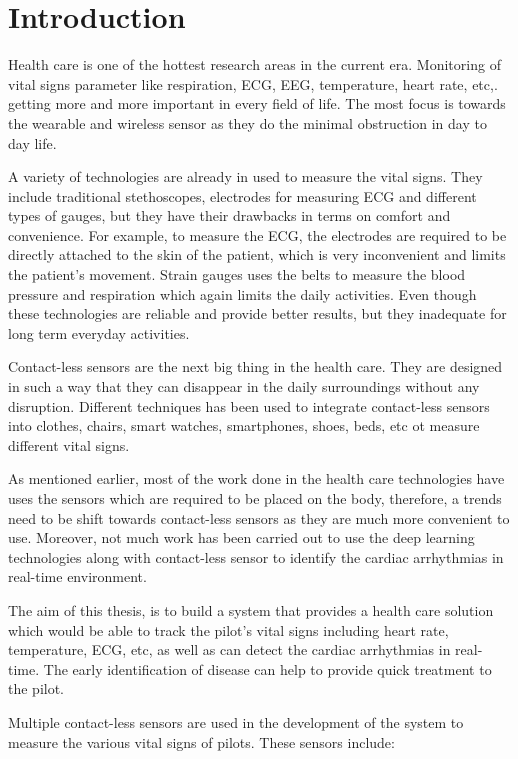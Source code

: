 \chapter{Introduction}
Health care is one of the hottest research areas in the current era. Monitoring of vital signs parameter like respiration, ECG, EEG, temperature, heart rate, etc,. getting more and more important in every field of life. The most focus is towards the wearable and wireless sensor as they do the minimal obstruction in day to day life.

A variety of technologies are already in used to measure the vital signs. They include traditional stethoscopes, electrodes for measuring ECG and different types of gauges, but they have their drawbacks in terms on comfort and convenience. For example, to measure the ECG, the electrodes are required to be directly attached to the skin of the patient, which is very inconvenient and limits the patient's movement. Strain gauges uses the belts to measure the blood pressure and respiration which again limits the daily activities. Even though these technologies are reliable and provide better results, but they inadequate for long term everyday activities.

Contact-less sensors are the next big thing in the health care. They are designed in such a way that they can disappear in the daily surroundings without any disruption. Different techniques has been used to integrate contact-less sensors into clothes, chairs, smart watches, smartphones, shoes, beds, etc ot measure different vital signs.


As mentioned earlier, most of the work done in the health care technologies have uses the sensors which are required to be placed on the body, therefore, a trends need to be shift towards contact-less sensors as they are much more convenient to use. Moreover, not much work has been carried out to use the deep learning technologies along with contact-less sensor to identify the cardiac arrhythmias in real-time environment. 

The aim of this thesis, is to build a system that provides a health care solution which would be able to track the pilot's vital signs including heart rate, temperature, ECG, etc, as well as can detect the cardiac arrhythmias in real-time. The early identification of disease can help to provide quick treatment to the pilot.

Multiple contact-less sensors are used in the development of the system to measure the various vital signs of pilots. These sensors include:

